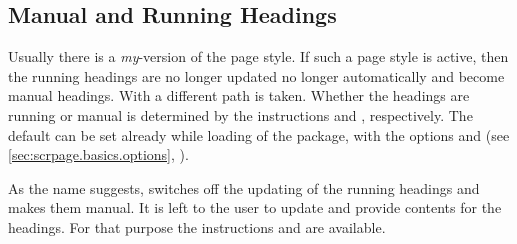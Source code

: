 \subsection{Manual and Running Headings}
\label{sec:scrpage.basics.mark}
%
%
%
%
Usually there is a \emph{my}-version of the 
page style.  If such a page style is active, then the running headings
are no longer updated no longer automatically and become manual
headings.  With  a different path is taken. Whether
the headings are running or manual is determined by the instructions
 and , respectively.  The default
can be set already while loading of the package, with the options
 and  (see
\autoref{sec:scrpage.basics.options},
).


\begin{Declaration}
\end{Declaration}%
%
As the name suggests,  switches off the updating of
the running headings and makes them manual. It is left to the user to
update and provide contents for the headings.  For that purpose the
instructions  and
 are available.%
%


